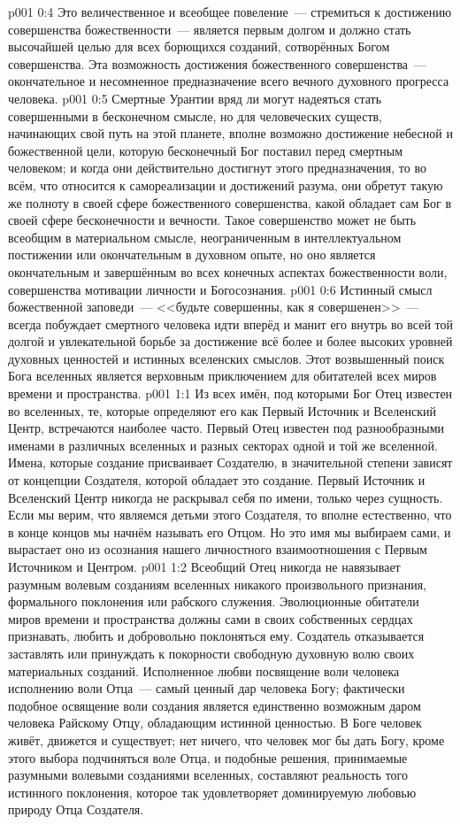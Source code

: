 \vs p001 0:4 Это величественное и всеобщее повеление~--- стремиться к достижению совершенства божественности~--- является первым долгом и должно стать высочайшей целью для всех борющихся созданий, сотворённых Богом совершенства. Эта возможность достижения божественного совершенства~--- окончательное и несомненное предназначение всего вечного духовного прогресса человека.
\vs p001 0:5 Смертные Урантии вряд ли могут надеяться стать совершенными в бесконечном смысле, но для человеческих существ, начинающих свой путь на этой планете, вполне возможно достижение небесной и божественной цели, которую бесконечный Бог поставил перед смертным человеком; и когда они действительно достигнут этого предназначения, то во всём, что относится к самореализации и достижений разума, они обретут такую же полноту в своей сфере божественного совершенства, какой обладает сам Бог в своей сфере бесконечности и вечности. Такое совершенство может не быть всеобщим в материальном смысле, неограниченным в интеллектуальном постижении или окончательным в духовном опыте, но оно является окончательным и завершённым во всех конечных аспектах божественности воли, совершенства мотивации личности и Богосознания.
\vs p001 0:6 Истинный смысл божественной заповеди~--- <<будьте совершенны, как я совершенен>>~--- всегда побуждает смертного человека идти вперёд и манит его внутрь во всей той долгой и увлекательной борьбе за достижение всё более и более высоких уровней духовных ценностей и истинных вселенских смыслов. Этот возвышенный поиск Бога вселенных является верховным приключением для обитателей всех миров времени и пространства.
\vs p001 1:1 Из всех имён, под которыми Бог Отец известен во вселенных, те, которые определяют его как Первый Источник и Вселенский Центр, встречаются наиболее часто. Первый Отец известен под разнообразными именами в различных вселенных и разных секторах одной и той же вселенной. Имена, которые создание присваивает Создателю, в значительной степени зависят от концепции Создателя, которой обладает это создание. Первый Источник и Вселенский Центр никогда не раскрывал себя по имени, только через сущность. Если мы верим, что являемся детьми этого Создателя, то вполне естественно, что в конце концов мы начнём называть его Отцом. Но это имя мы выбираем сами, и вырастает оно из осознания нашего личностного взаимоотношения с Первым Источником и Центром.
\vs p001 1:2 Всеобщий Отец никогда не навязывает разумным волевым созданиям вселенных никакого произвольного признания, формального поклонения или рабского служения. Эволюционные обитатели миров времени и пространства должны сами в своих собственных сердцах признавать, любить и добровольно поклоняться ему. Создатель отказывается заставлять или принуждать к покорности свободную духовную волю своих материальных созданий. Исполненное любви посвящение воли человека исполнению воли Отца~--- самый ценный дар человека Богу; фактически подобное освящение воли создания является единственно возможным даром человека Райскому Отцу, обладающим истинной ценностью. В Боге человек живёт, движется и существует; нет ничего, что человек мог бы дать Богу, кроме этого выбора подчиняться воле Отца, и подобные решения, принимаемые разумными волевыми созданиями вселенных, составляют реальность того истинного поклонения, которое так удовлетворяет доминируемую любовью природу Отца Создателя.
